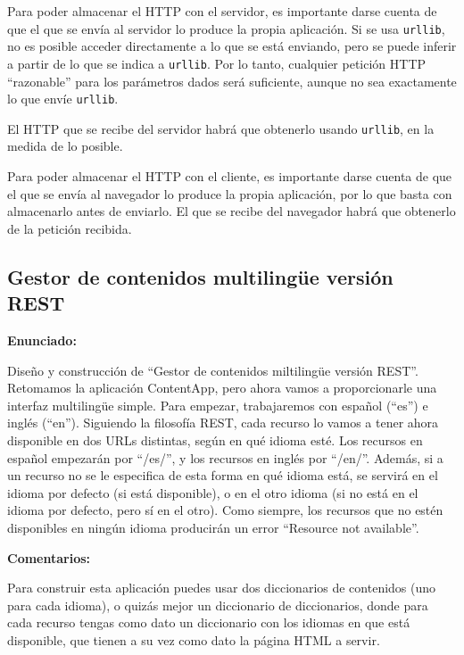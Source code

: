 Para poder almacenar el HTTP con el servidor, es importante darse cuenta de que el que se envía al servidor lo produce la propia aplicación. Si se usa \texttt{urllib}, no es posible acceder directamente a lo que se está enviando, pero se puede inferir a partir de lo que se indica a \texttt{urllib}. Por lo tanto, cualquier petición HTTP ``razonable'' para los parámetros dados será suficiente, aunque no sea exactamente lo que envíe \texttt{urllib}.

El HTTP que se recibe del servidor habrá que obtenerlo usando \texttt{urllib}, en la medida de lo posible.

Para poder almacenar el HTTP con el cliente, es importante darse cuenta de que el que se envía al navegador lo produce la propia aplicación, por lo que basta con almacenarlo antes de enviarlo. El que se recibe del navegador habrá que obtenerlo de la petición recibida.

\subsection{Gestor de contenidos multilingüe versión REST}
\label{subsec:contentappmulti}

\textbf{Enunciado:}

Diseño y construcción de ``Gestor de contenidos miltilingüe versión REST''. Retomamos la aplicación ContentApp, pero ahora vamos a proporcionarle una interfaz multilingüe simple. Para empezar, trabajaremos con español (``es'') e inglés (``en''). Siguiendo la filosofía REST, cada recurso lo vamos a tener ahora disponible en dos URLs distintas, según en qué idioma esté. Los recursos en español empezarán por ``/es/'', y los recursos en inglés por ``/en/''. Además, si a un recurso no se le especifica de esta forma en qué idioma está, se servirá en el idioma por defecto (si está disponible), o en el otro idioma (si no está en el idioma por defecto, pero sí en el otro). Como siempre, los recursos que no estén disponibles en ningún idioma producirán un error ``Resource not available''.

\textbf{Comentarios:}

Para construir esta aplicación puedes usar dos diccionarios de contenidos (uno para cada idioma), o quizás mejor un diccionario de diccionarios, donde para cada recurso tengas como dato un diccionario con los idiomas en que está disponible, que tienen a su vez como dato la página HTML a servir.


